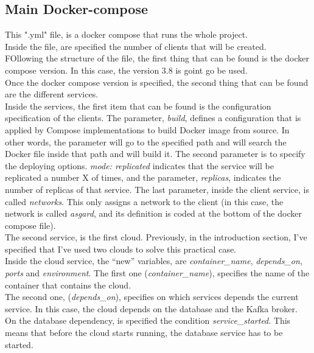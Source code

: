 \documentclass[a4paper,12pt]{article}
\begin{document}
\subsection*{Main Docker-compose}
This ".yml" file, is a docker compose that runs the whole project.\\
Inside the file, are specified the number of clients that will be created.\\
FOllowing the structure of the file, the first thing that can be found is the docker compose version. In this case, the version 3.8 is goint go be used.\\
Once the docker compose version is specified, the second thing that can be found are the different services.\\
Inside the services, the first item that can be found is the configuration specification of the clients. The parameter, \textit{build}, defines a configuration that is applied by Compose implementations to build Docker image from source. In other words, the parameter will go to the specified path and will search the Docker file inside that path and will build it. The second parameter is to specify the deploying options. \textit{mode: replicated} indicates that the service will be replicated a number X of times, and the parameter, \textit{replicas}, indicates the number of replicas of that service. The last parameter, inside the client service, is called \textit{networks}. This only assigns a network to the client (in this case, the network is called \textit{asgard}, and its definition is coded at the bottom of the docker compose file).\\
The second service, is the first cloud. Previously, in the introduction section, I've specified that I've used two clouds to solve this practical case.\\
Inside the cloud service, the “new” variables, are \textit{container\_name}, \textit{depends\_on}, \textit{ports} and \textit{environment}.
The first one (\textit{container\_name}), specifies the name of the container that contains the cloud.\\
The second one, (\textit{depends\_on}), specifies on which services depends the current service. In this case, the cloud depends on the database and the Kafka broker.\\
On the database dependency, is specified the condition \textit{service\_started}. This means that before the cloud starts running, the database service has to be started.\\
\end{document}
